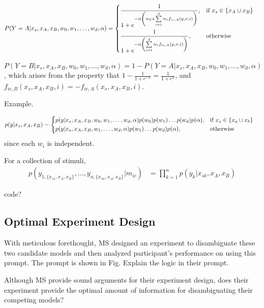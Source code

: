 \documentclass[11pt]{article}
\begin{document}
\begin{align}
    P(Y=A| x_s, x_A, x_B, w_0, w_1, \dots, w_d, \alpha) &= 
        \begin{dcases}
            \frac{1}{1 + e^{-\alpha \left(w_0 + \sum \limits_{i=1}^d w_i f_{ic,A}(y, x, i)\right)}}, & \text{if } x_s \in \{x_A \cup x_B\}\\
            \frac{1}{1 + e^{-\alpha \left(\sum \limits_{i=1}^d w_i f_{ic,A}(y, x, i)\right)}}, & \text{otherwise }
        \end{dcases}
\end{align}

$P(Y=B| x_s, x_A, x_B, w_0, w_1, \dots, w_d, \alpha) = 1- P(Y=A| x_s, x_A, x_B, w_0, w_1, \dots, w_d, \alpha)$, which arises from the property that $1-\frac{1}{1+e^{-x}} = \frac{1}{1+e^x}$, and $f_{ic,B}(x_s, x_A, x_B, i) = -f_{ic,A}(x_s, x_A, x_B, i)$.

Example.

\begin{align}
    p(y | x_s, x_A, x_B) &=  
        \begin{dcases}
            p(y|x_s, x_A, x_B, w_0, w_1, \dots, w_d, \alpha) p(w_0) p(w_1) \dots p(w_d) p(\alpha), & \text{if } x_s \in \{x_a \cup x_b\}\\
            p(y|x_s, x_A, x_B, w_1, \dots, w_d, \alpha) p(w_1) \dots p(w_d) p(\alpha), & \text{otherwise}
        \end{dcases}
\end{align}
since each $w_i$ is independent.

For a collection of stimuli, 
\begin{align}
    p(y_{1,\{x_{s1}, x_A, x_B\}}, \dots, y_{n,\{x_{sn}, x_A, x_B\}} | m_{ic}) &=  \prod\limits_{k=1}^n p(y_k|x_{sk}, x_A, x_B) 
\end{align}

code?

\subsection{Optimal Experiment Design}
With meticulous forethought, MS designed an experiment to disambiguate these two candidate models and then analyzed participant's performance on using this prompt. The prompt is shown in Fig. Explain the logic in their prompt.

Although MS provide sound arguments for their experiment design, does their experiment provide the optimal amount of information for disambiguating their competing models?
\end{document}
